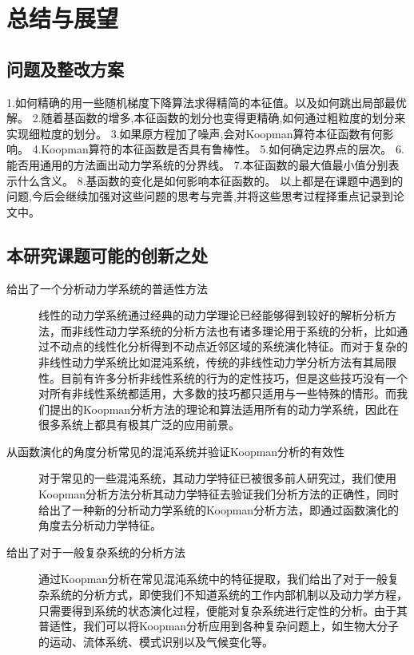 \chapter{总结与展望}
\section{问题及整改方案}
1.如何精确的用一些随机梯度下降算法求得精简的本征值。以及如何跳出局部最优解。
2.随着基函数的增多,本征函数的划分也变得更精确,如何通过粗粒度的划分来实现细粒度的划分。
3.如果原方程加了噪声,会对Koopman算符本征函数有何影响。
4.Koopman算符的本征函数是否具有鲁棒性。
5.如何确定边界点的层次。
6.能否用通用的方法画出动力学系统的分界线。
7.本征函数的最大值最小值分别表示什么含义。
8.基函数的变化是如何影响本征函数的。
以上都是在课题中遇到的问题,今后会继续加强对这些问题的思考与完善,并将这些思考过程择重点记录到论文中。
\section{本研究课题可能的创新之处}
\begin{description}
    \item[给出了一个分析动力学系统的普适性方法]

    线性的动力学系统通过经典的动力学理论已经能够得到较好的解析分析方法，而非线性动力学系统的分析方法也有诸多理论用于系统的分析，比如通过不动点的线性化分析得到不动点近邻区域的系统演化特征。而对于复杂的非线性动力学系统比如混沌系统，传统的非线性动力学分析方法有其局限性。目前有许多分析非线性系统的行为的定性技巧，但是这些技巧没有一个对所有非线性系统都适用，大多数的技巧都只适用与一些特殊的情形。而我们提出的Koopman分析方法的理论和算法适用所有的动力学系统，因此在很多系统上都具有极其广泛的应用前景。

    \item[从函数演化的角度分析常见的混沌系统并验证Koopman分析的有效性]
     
    对于常见的一些混沌系统，其动力学特征已被很多前人研究过，我们使用Koopman分析方法分析其动力学特征去验证我们分析方法的正确性，同时给出了一种新的分析动力学系统的Koopman分析方法，即通过函数演化的角度去分析动力学特征。

    \item[给出了对于一般复杂系统的分析方法]
     
    通过Koopman分析在常见混沌系统中的特征提取，我们给出了对于一般复杂系统的分析方式，即使我们不知道系统的工作内部机制以及动力学方程，只需要得到系统的状态演化过程，便能对复杂系统进行定性的分析。由于其普适性，我们可以将Koopman分析应用到各种复杂问题上，如生物大分子的运动、流体系统、模式识别以及气候变化等。
 
\end{description}
% 
% 
